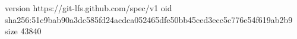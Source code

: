 version https://git-lfs.github.com/spec/v1
oid sha256:51c9bab90a3dc585fd24acdca052465dfe50bb45ced3ecc5c776e54f619ab2b9
size 43840
